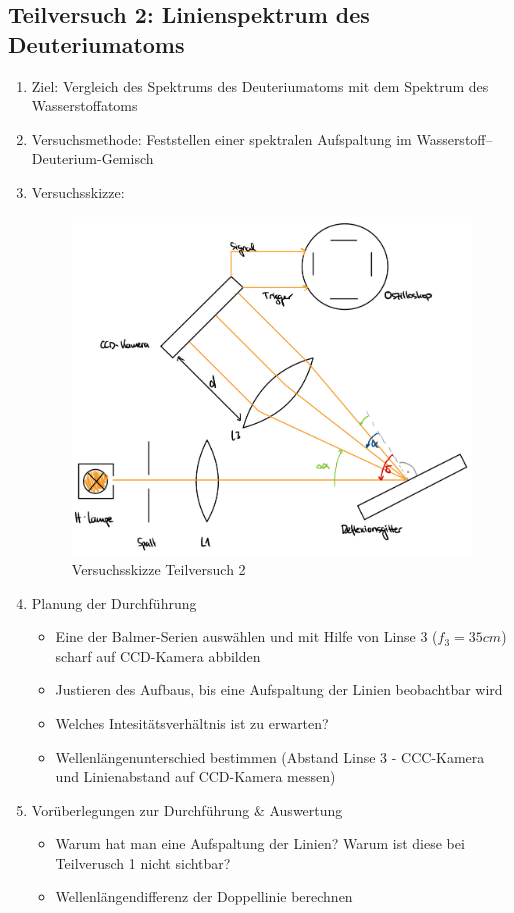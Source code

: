 \documentclass{article}
\begin{document}
\newpage

\subsection{Teilversuch 2: Linienspektrum des Deuteriumatoms}
\begin{enumerate}[label = (\Roman*)]
    \item Ziel: Vergleich des Spektrums des Deuteriumatoms mit dem Spektrum des Wasserstoffatoms 
    
    \item Versuchsmethode: Feststellen einer spektralen Aufspaltung im Wasserstoff–Deuterium-Gemisch
    
    \item Versuchsskizze:
    
        \begin{figure}[H]
        \centering
        \includegraphics[width=0.7\linewidth]{Abbildungen/TV2.jpeg}
        \caption{Versuchsskizze Teilversuch 2}
        \end{figure}

    \item Planung der Durchführung
        \begin{itemize}
           \item Eine der Balmer-Serien auswählen und mit Hilfe von Linse 3 ($f_3=35cm$) scharf auf CCD-Kamera abbilden
           \item Justieren des Aufbaus, bis eine Aufspaltung der Linien beobachtbar wird
           \item Welches Intesitätsverhältnis ist zu erwarten?
           \item Wellenlängenunterschied bestimmen (Abstand Linse 3 - CCC-Kamera und Linienabstand auf CCD-Kamera messen)
        \end{itemize}

    \item Vorüberlegungen zur Durchführung \& Auswertung
        \begin{itemize}
            \item Warum hat man eine Aufspaltung der Linien? Warum ist diese bei Teilverusch 1 nicht sichtbar?
            \item Wellenlängendifferenz der Doppellinie berechnen
        \end{itemize}
        
\end{enumerate}
\end{document}
